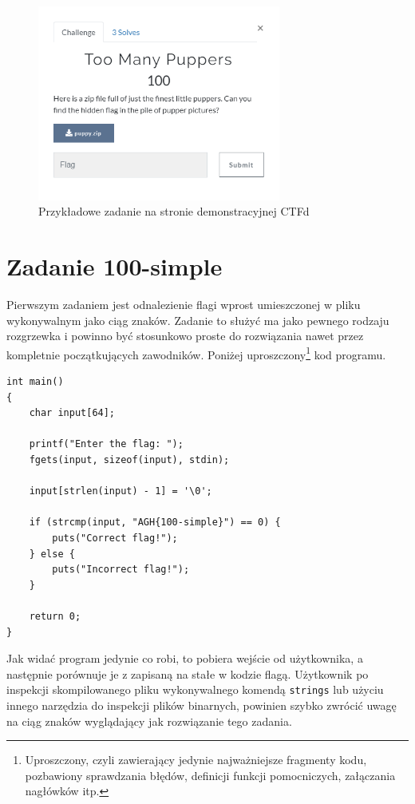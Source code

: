 \documentclass[language=polish,type=eng]{aghmodern}
\begin{document}
\begin{figure}[H]
\centering
\includegraphics[width=8cm]{ctfd}
\caption{Przykładowe zadanie na stronie demonstracyjnej CTFd}
\end{figure}

\section{Zadanie 100-simple}

Pierwszym zadaniem jest odnalezienie flagi wprost umieszczonej
w pliku wykonywalnym jako ciąg znaków.
Zadanie to służyć ma jako pewnego rodzaju rozgrzewka i powinno być stosunkowo
proste do rozwiązania nawet przez kompletnie początkujących zawodników.
Poniżej uproszczony\footnote{Uproszczony, czyli zawierający jedynie
najważniejsze fragmenty kodu, pozbawiony sprawdzania błędów, definicji funkcji
pomocniczych, załączania nagłówków itp.} kod programu.

\begin{verbatim}
int main()
{
    char input[64];

    printf("Enter the flag: ");
    fgets(input, sizeof(input), stdin);

    input[strlen(input) - 1] = '\0';

    if (strcmp(input, "AGH{100-simple}") == 0) {
        puts("Correct flag!");
    } else {
        puts("Incorrect flag!");
    }

    return 0;
}
\end{verbatim}

Jak widać program jedynie co robi, to pobiera wejście od użytkownika, a następnie
porównuje je z zapisaną na stałe w kodzie flagą. Użytkownik po inspekcji skompilowanego
pliku wykonywalnego komendą \texttt{strings} lub użyciu innego narzędzia
do inspekcji plików binarnych, powinien szybko zwrócić uwagę na
ciąg znaków wyglądający jak rozwiązanie tego zadania.
\end{document}
